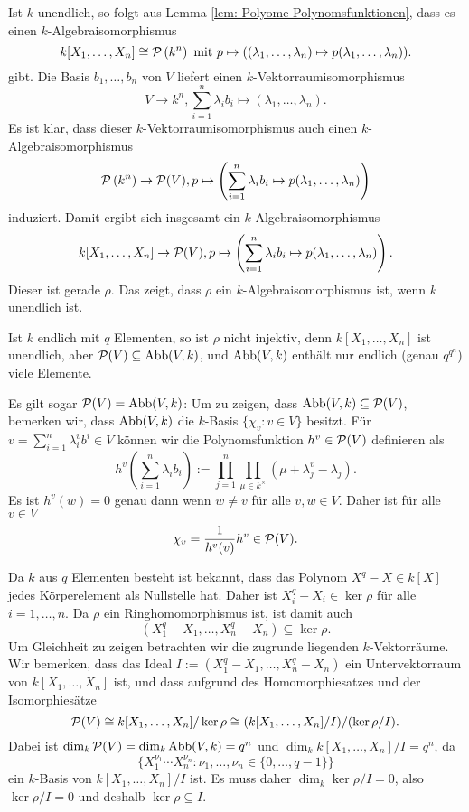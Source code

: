 \documentclass[a4paper,10pt]{article}
\begin{document}
Ist $k$ unendlich, so folgt aus Lemma \ref{lem: Polyome Polynomsfunktionen}, dass es einen $k$-Algebraisomorphismus
\[
 k[X_1, \ldots, X_n] \cong \mathcal{P}\left(k^n\right) \text{ mit }
 p \mapsto ((\lambda_1, \ldots, \lambda_n) \mapsto p(\lambda_1, \ldots, \lambda_n)).
\]
gibt. Die Basis $b_1, \ldots, b_n$ von $V$ liefert einen $k$-Vektorraumisomorphismus
\[
 V \to k^n, \sum_{i=1}^n \lambda_i b_i \mapsto (\lambda_1, \ldots, \lambda_n).
\]
Es ist klar, dass dieser $k$-Vektorraumisomorphismus auch einen $k$-Algebra\-iso\-mor\-phismus
\[
 \mathcal{P}\left(k^n\right) \to \mathcal{P}(V), p \mapsto \left(\sum_{i=1}^n \lambda_i b_i \mapsto p(\lambda_1, \ldots, \lambda_n)\right)
\]
induziert. Damit ergibt sich insgesamt ein $k$-Algebraisomorphismus
\[
 k[X_1, \ldots, X_n] \to \mathcal{P}(V), p \mapsto \left( \sum_{i=1}^n \lambda_i b_i \mapsto p(\lambda_1, \ldots, \lambda_n) \right).
\]
Dieser ist gerade $\rho$. Das zeigt, dass $\rho$ ein $k$-Algebraisomorphismus ist, wenn $k$ unendlich ist.

Ist $k$ endlich mit $q$ Elementen, so ist $\rho$ nicht injektiv, denn $k[X_1, \ldots, X_n]$ ist unendlich, aber $\mathcal{P}(V) \subseteq \operatorname{Abb}(V,k)$, und $\operatorname{Abb}(V,k)$ enthält nur endlich (genau $q^{q^n}$) viele Elemente.

Es gilt sogar $\mathcal{P}(V) = \operatorname{Abb}(V,k)$: Um zu zeigen, dass $\operatorname{Abb}(V,k) \subseteq \mathcal{P}(V)$, bemerken wir, dass $\operatorname{Abb}(V,k)$ die $k$-Basis $\{\chi_v : v \in V\}$ besitzt. Für $v = \sum_{i=1}^n \lambda^v_i b^i \in V$ können wir die Polynomsfunktion $h^v \in \mathcal{P}(V)$ definieren als
\[
 h^v\left(\sum_{i=1}^n \lambda_i b_i\right) := \prod_{j=1}^n \prod_{\mu \in k^\times} (\mu +  \lambda^v_j - \lambda_j).
\]
Es ist $h^v(w) = 0$ genau dann wenn $w \neq v$ für alle $v, w \in V$. Daher ist für alle $v \in V$
\[
 \chi_v = \frac{1}{h^v(v)} h^v \in \mathcal{P}(V).
\]

Da $k$ aus $q$ Elementen besteht ist bekannt, dass das Polynom $X^q-X \in k[X]$ jedes Körperelement als Nullstelle hat. Daher ist $X_i^q-X_i \in \ker \rho$ für alle $i=1,\ldots,n$. Da $\rho$ ein Ringhomomorphismus ist, ist damit auch
\[
 (X_1^q-X_1, \ldots, X_n^q-X_n) \subseteq \ker \rho.
\]
Um Gleichheit zu zeigen betrachten wir die zugrunde liegenden $k$-Vektorräume. Wir bemerken, dass das Ideal $I := (X_1^q-X_1, \ldots, X_n^q-X_n)$ ein Untervektorraum von $k[X_1, \ldots, X_n]$ ist, und dass aufgrund des Homomorphiesatzes und der Isomorphiesätze
\[
 \mathcal{P}(V) \cong k[X_1, \ldots, X_n] / \ker \rho \cong (k[X_1, \ldots, X_n] / I)/(\ker \rho / I).
\]
Dabei ist $\dim_k \mathcal{P}(V) = \dim_k \operatorname{Abb}(V,k) = q^n$ und $\dim_k k[X_1, \ldots, X_n] / I = q^n$, da
\[
 \{X_1^{\nu_1} \cdots X_n^{\nu_n} : \nu_1, \ldots, \nu_n \in \{0,\ldots,q-1\}\}
\]
ein $k$-Basis von $k[X_1, \ldots, X_n] / I$ ist. Es muss daher $\dim_k \ker \rho/I = 0$, also $\ker \rho/I = 0$ und deshalb $\ker \rho \subseteq I$.
\end{document}
